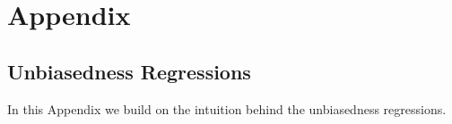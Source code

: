 \section{Appendix}
\label{sec:appendix}

\subsection{Unbiasedness Regressions}
In this Appendix we build on the intuition behind the unbiasedness regressions.

